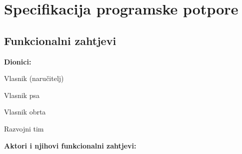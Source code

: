 \chapter{Specifikacija programske potpore}
		
	\section{Funkcionalni zahtjevi}
			
			
				
			
			
			\noindent \textbf{Dionici:}
			
			\begin{packed_enum}
				
				\item Vlasnik (naručitelj)
				\item Vlasnik psa
				\item Vlasnik obrta
				\item Razvojni tim
				
			\end{packed_enum}
			
			\noindent \textbf{Aktori i njihovi funkcionalni zahtjevi:}
			
